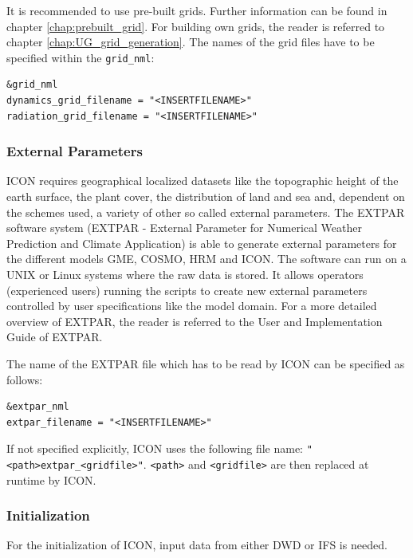 It is recommended to use pre-built grids. Further information can be found in chapter \ref{chap:prebuilt_grid}. For building own grids, the reader is referred to chapter \ref{chap:UG_grid_generation}. The names of the grid files have to be specified within the \verb+grid_nml+:

\begin{verbatim}
&grid_nml
dynamics_grid_filename = "<INSERTFILENAME>"
radiation_grid_filename = "<INSERTFILENAME>"
\end{verbatim}

\subsubsection{External Parameters}\label{InputReal:Ext}

ICON requires geographical localized datasets like the topographic height of the earth surface, the plant cover, the distribution of land and sea and, dependent on the schemes used, a variety of other so called external parameters. The EXTPAR software system (EXTPAR - External Parameter for Numerical Weather Prediction and Climate Application) is able to generate external parameters for the different models GME, COSMO, HRM and ICON. The software can run on a UNIX or Linux systems where the raw data is stored. It allows operators (experienced users) running the scripts to create new external parameters controlled by user specifications like the model domain. For a more detailed overview of EXTPAR, the reader is referred to the User and Implementation Guide of EXTPAR. 

The name of the EXTPAR file which has to be read by ICON can be specified as follows:

\begin{verbatim}
&extpar_nml
extpar_filename = "<INSERTFILENAME>"
\end{verbatim}

If not specified explicitly, ICON uses the following file name: \newline
\verb+"<path>extpar_<gridfile>"+.\newline
 \verb+<path>+ and \verb+<gridfile>+ are then replaced at runtime by ICON.

\subsubsection{Initialization}\label{InputReal:Ini}

For the initialization of ICON, input data from either DWD or IFS is needed. 

